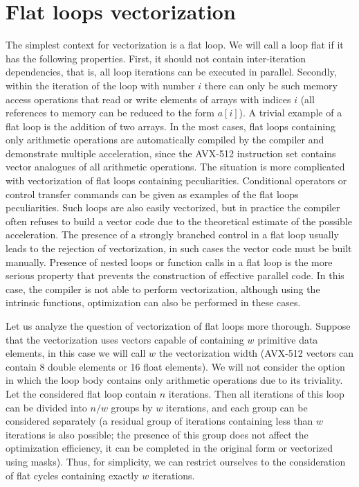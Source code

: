 \documentclass[
11pt,%
tightenlines,%
twoside,%
onecolumn,%
nofloats,%
nobibnotes,%
nofootinbib,%
superscriptaddress,%
noshowpacs,%
centertags]%
{revtex4}
\begin{document}
\section{Flat loops vectorization}

The simplest context for vectorization is a flat loop.
We will call a loop flat if it has the following properties.
First, it should not contain inter-iteration dependencies, that is, all loop iterations can be executed in parallel.
Secondly, within the iteration of the loop with number $i$ there can only be such memory access operations that read or write elements of arrays with indices $i$ (all references to memory can be reduced to the form $a[i]$).
A trivial example of a flat loop is the addition of two arrays.
In the most cases, flat loops containing only arithmetic operations are automatically compiled by the compiler and demonstrate multiple acceleration, since the AVX-512 instruction set contains vector analogues of all arithmetic operations.
The situation is more complicated with vectorization of flat loops containing peculiarities.
Conditional operators or control transfer commands can be given as examples of the flat loops peculiarities.
Such loops are also easily vectorized, but in practice the compiler often refuses to build a vector code due to the theoretical estimate of the possible acceleration.
The presence of a strongly branched control in a flat loop usually leads to the rejection of vectorization, in such cases the vector code must be built manually.
Presence of nested loops or function calls in a flat loop is the more serious property that prevents the construction of effective parallel code.  
In this case, the compiler is not able to perform vectorization, although using the intrinsic functions, optimization can also be performed in these cases.

Let us analyze the question of vectorization of flat loops more thorough.
Suppose that the vectorization uses vectors capable of containing $w$ primitive data elements, in this case we will call $w$ the vectorization width (AVX-512 vectors can contain 8 double elements or 16 float elements).
We will not consider the option in which the loop body contains only arithmetic operations due to its triviality.
Let the considered flat loop contain $n$ iterations.
Then all iterations of this loop can be divided into $n / w$ groups by $w$ iterations, and each group can be considered separately (a residual group of iterations containing less than $w$ iterations is also possible; the presence of this group does not affect the optimization efficiency, it can be completed in the original form or vectorized using masks).
Thus, for simplicity, we can restrict ourselves to the consideration of flat cycles containing exactly $w$ iterations.
\end{document}

